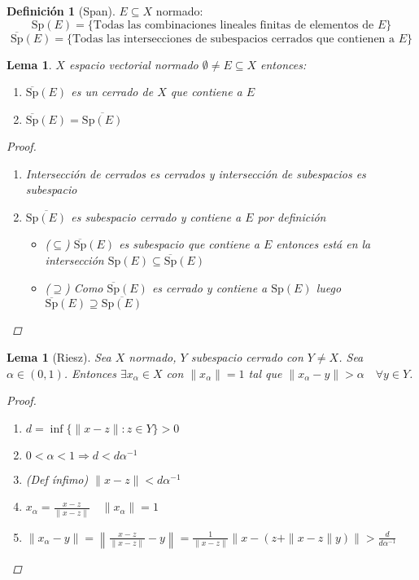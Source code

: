 \documentclass[12pt,a4paper]{article}
\newtheorem{lemma}[theorem]{Lema}
\theoremstyle{definition}
\newtheorem{definition}[theorem]{Definición}
\theoremstyle{remark}
\begin{document}
\begin{definition}[Span]
$E\subseteq X$ normado:
$$\text{Sp}(E) = \{\text{Todas las combinaciones lineales finitas de elementos de } E\}$$
$$\overline{\text{Sp}}(E)=\{\text{Todas las intersecciones de subespacios cerrados que contienen a }E\}$$
\end{definition}

\begin{lemma}
$X$ espacio vectorial normado $\emptyset\neq E \subseteq X$ entonces:
\begin{enumerate}
    \item $\overline{\text{Sp}}(E)$ es un cerrado de $X$ que contiene a $E$
    \item $\overline{\text{Sp}}(E) = \overline{\text{Sp}(E)}$
\end{enumerate}
\begin{proof}
\begin{enumerate}
    \item Intersección de cerrados es cerrados y intersección de subespacios es subespacio
    \item $\overline{\text{Sp}(E)}$ es subespacio cerrado y contiene a $E$ por definición
    \begin{itemize}
        \item ($\subseteq$) $\overline{\text{Sp}}(E)$ es subespacio que contiene a $E$ entonces está en la intersección $\text{Sp}(E)\subseteq\overline{\text{Sp}}(E)$
        \item ($\supseteq$) Como $\overline{\text{Sp}}(E)$ es cerrado y contiene a $\text{Sp}(E)$ luego $\overline{\text{Sp}}(E)\supseteq \overline{\text{Sp}(E)}$
    \end{itemize}
\end{enumerate}
\end{proof}
\end{lemma}

\begin{lemma}[Riesz]
Sea $X$ normado, $Y$ subespacio cerrado con $Y\neq X$. Sea $\alpha \in(0,1)$. Entonces $\exists x_{\alpha}\in X$ con $\|x_{\alpha}\|=1$ tal que $\|x_{\alpha}-y\| >\alpha \quad \forall y\in Y$.
\begin{proof}
\begin{enumerate}
    \item $d=\inf\{\|x-z\|:z\in Y\}>0$
    \item $0<\alpha<1 \Rightarrow d<d\alpha^{-1}$
    \item (Def ínfimo) $\|x-z\|<d\alpha^{-1}$
    \item $x_{\alpha}=\frac{x-z}{\|x-z\|}\quad \|x_{\alpha}\|=1$
    \item $\|x_{\alpha}-y\| =\left\|\frac{x-z}{\|x-z\|}-y\right\| = \frac{1}{\|x-z\|}\|x-(z+\|x-z\|y)\| > \frac{d}{d\alpha^{-1}}$
\end{enumerate}
\end{proof}
\end{lemma}
\end{document}
